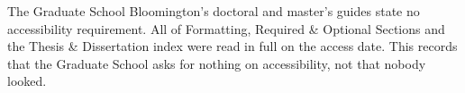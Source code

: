 %
%


%


%
	{The Graduate School Bloomington's doctoral and master's guides state no
	 accessibility requirement. All of Formatting, Required \& Optional Sections
	 and the Thesis \& Dissertation index were read in full on the access date.
	 This records that the Graduate School asks for nothing on accessibility,
	 not that nobody looked.}

